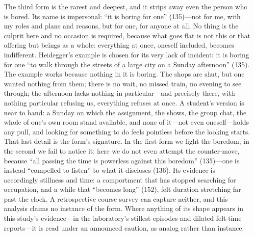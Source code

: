 The third form is the rarest and deepest, and it strips away even the
person who is bored. Its name is impersonal: ``it is boring for one''
(135)---not for me, with my roles and plans and reasons, but for one,
for anyone at all. No thing is the culprit here and no occasion is
required, because what goes flat is not this or that offering but
beings as a whole: everything at once, oneself included, becomes
indifferent. Heidegger's example is chosen for its very lack of
incident: it is boring for one ``to walk through the streets of a
large city on a Sunday afternoon'' (135). The example works because
nothing in it is boring. The shops are shut, but one wanted nothing
from them; there is no wait, no missed train, no evening to see
through; the afternoon lacks nothing in particular---and precisely
there, with nothing particular refusing us, everything refuses at
once. A student's version is near to hand: a Sunday on which the
assignment, the shows, the group chat, the whole of one's own room
stand available, and none of it---not even oneself---holds any pull,
and looking for something to do feels pointless before the looking
starts. That last detail is the form's signature. In the first form we
fight the boredom; in the second we fail to notice it; here we do not
even attempt the counter-move, because ``all passing the time is
powerless against this boredom'' (135)---one is instead ``compelled to
listen'' to what it discloses (136). Its evidence is accordingly
stillness and time: a comportment that has stopped searching for
occupation, and a while that ``becomes long'' (152), felt duration
stretching far past the clock. A retrospective course survey can
capture neither, and this analysis claims no instance of the form.
Where anything of its shape appears in this study's evidence---in the
laboratory's stillest episodes and dilated felt-time reports---it is
read under an announced caution, as analog rather than instance.

